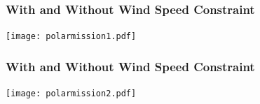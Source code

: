 \documentclass{beamer}
\begin{document}
\begin{frame}
    \frametitle{With and Without Wind Speed Constraint}

    \begin{center}
    \texttt{[image: polarmission1.pdf]} \\
    \end{center}

\end{frame}

\begin{frame}
    \frametitle{With and Without Wind Speed Constraint}

    \begin{center}
    \texttt{[image: polarmission2.pdf]} \\
    \end{center}

\end{frame}
\end{document}
